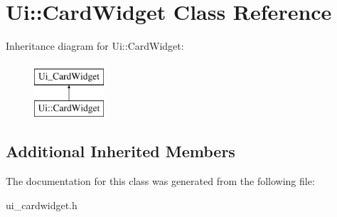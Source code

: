 \hypertarget{class_ui_1_1_card_widget}{}\section{Ui\+:\+:Card\+Widget Class Reference}
\label{class_ui_1_1_card_widget}
Inheritance diagram for Ui\+:\+:Card\+Widget\+:\begin{figure}[H]
\begin{center}
\leavevmode
\includegraphics[height=2.000000cm]{class_ui_1_1_card_widget}
\end{center}
\end{figure}
\subsection*{Additional Inherited Members}


The documentation for this class was generated from the following file\+:\begin{DoxyCompactItemize}
\item 
ui\+\_\+cardwidget.\+h\end{DoxyCompactItemize}
